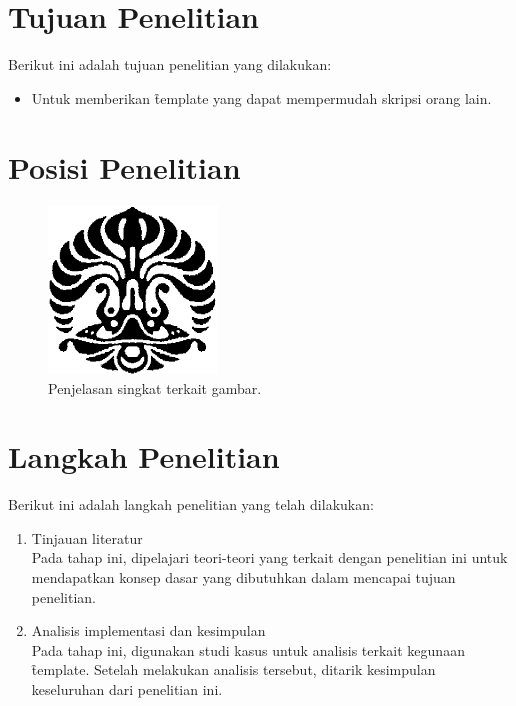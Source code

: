 \section{Tujuan Penelitian}
Berikut ini adalah tujuan penelitian yang dilakukan:
\begin{itemize}
	\item Untuk memberikan \f{template} yang dapat mempermudah skripsi orang lain.
\end{itemize}


\section{Posisi Penelitian}

\begin{figure}
	\centering
	\includegraphics[width=0.4\textwidth]{pics/makara.png}
	\caption{Penjelasan singkat terkait gambar.}
	\label{fig:research_position}
\end{figure}



\section{Langkah Penelitian}
Berikut ini adalah langkah penelitian yang telah dilakukan:
\begin{enumerate}
	\item Tinjauan literatur \\
	Pada tahap ini, dipelajari teori-teori yang terkait dengan penelitian ini untuk mendapatkan konsep dasar yang dibutuhkan dalam mencapai tujuan penelitian.
	\item Analisis implementasi dan kesimpulan \\
	Pada tahap ini, digunakan studi kasus untuk analisis terkait kegunaan \f{template}. Setelah melakukan analisis tersebut, ditarik kesimpulan keseluruhan dari penelitian ini.
\end{enumerate}



